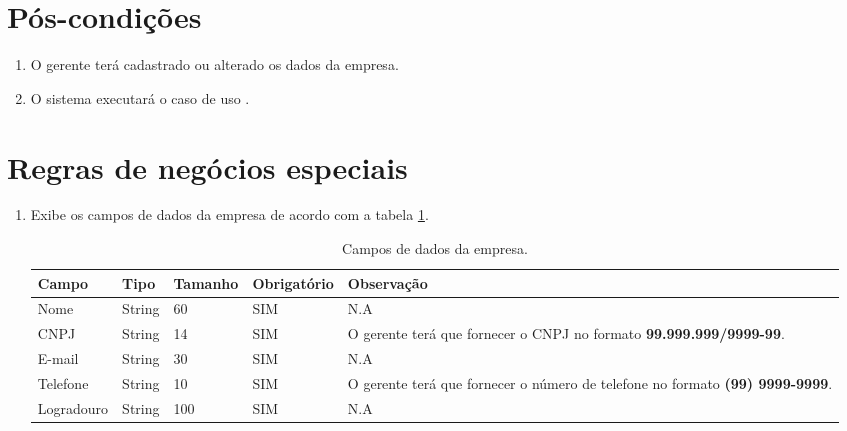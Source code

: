 \section{Pós-condições}

\begin{enumerate}
	\item O gerente terá cadastrado ou alterado os dados da empresa.
	\item O sistema executará o caso de uso .	
\end{enumerate}

\section{Regras de negócios especiais}

\begin{enumerate}[label=RN\arabic*]
	\item Exibe os campos de dados da empresa de acordo com a tabela \ref{uc004_tb_rn1}. \label{uc004_rn:1}
	\begin{table}[htb]
		\ABNTEXfontereduzida
		\caption[Campos de dados da empresa]{Campos de dados da empresa.}
		\label{uc004_tb_rn1}
		\begin{tabular}{|p{3.0cm}|p{2.0cm}|p{1.5cm}|p{2.0cm}|p{5.75cm}|}
			\hline
			\textbf{Campo} & \textbf{Tipo} & \textbf{Tamanho} & \textbf{Obrigatório} & \textbf{Observação}                                                                  \\ \hline
			Nome           & String        & 60               & SIM                  & N.A                                                                                  \\ \hline
			CNPJ           & String        & 14               & SIM                  & O gerente terá que fornecer o CNPJ no formato \textbf{99.999.999/9999-99}.           \\ \hline
			E-mail         & String        & 30               & SIM                  & N.A                                                                                  \\ \hline
			Telefone       & String        & 10               & SIM                  & O gerente terá que fornecer o número de telefone no formato \textbf{(99) 9999-9999}. \\ \hline
			Logradouro     & String        & 100              & SIM                  & N.A                                                                                  \\ \hline

\end{tabular}
\end{table}
\end{enumerate}
